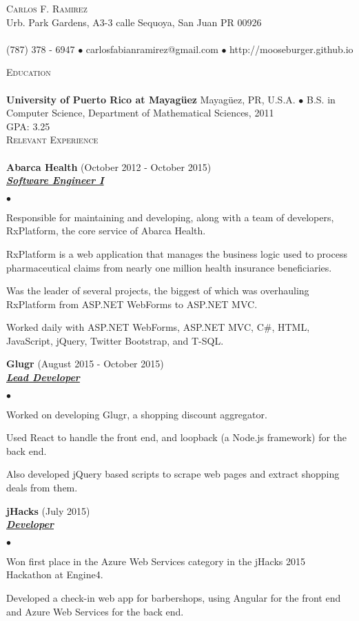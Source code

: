 \documentclass{article}
\newcommand{\lineunder}{\vspace*{-8pt} \\ \hspace*{-18pt} \hrulefill \\}
\newcommand{\header}[1]{{\hspace*{-15pt}\vspace*{6pt} \textsc{#1}} \vspace*{-6pt} \lineunder}
\newcommand{\employer}[3]{{ \textbf{#1} (#2)\\ \underline{\textbf{\emph{#3}}}\\  }}
\newcommand{\contact}[3]{
\vspace*{-8pt}
\begin{center}
{\LARGE \scshape {#1}}\\
#2 \lineunder 
#3
\end{center}
\vspace*{-8pt}
}
\newenvironment{achievements}{\begin{list}{$\bullet$}{\topsep 0pt \itemsep -2pt}}{\vspace*{4pt}\end{list}}
\newcommand{\school}[4]{
 \textbf{#1} #2 $\bullet$ #3\\
 #4 \\
}
\begin{document}
\small
\smallskip
\vspace*{-44pt}

\contact{Carlos F. Ramirez}
{Urb. Park Gardens, A3-3 calle Sequoya, San Juan PR 00926}
{(787) 378 - 6947 $\bullet$ carlosfabianramirez@gmail.com $\bullet$ http://mooseburger.github.io}

\header{Education}

\school{University of Puerto Rico at Mayag\"{u}ez}{Mayag\"{u}ez, PR, U.S.A.}{B.S. in Computer Science, Department of Mathematical Sciences, 2011}
{GPA: 3.25}
\header{Relevant Experience}

\employer{Abarca Health}{October 2012 - October 2015}{Software Engineer I}
	\begin{achievements}
	\item Responsible for maintaining and developing, along with a team of developers, RxPlatform, the core service of Abarca Health.
	\item RxPlatform is a web application that manages the business logic used to process pharmaceutical claims from nearly one million health insurance beneficiaries.
	\item Was the leader of several projects, the biggest of which was overhauling RxPlatform from ASP.NET WebForms to ASP.NET MVC. 	
	\item Worked daily with ASP.NET WebForms, ASP.NET MVC, C\string#, HTML, JavaScript, jQuery, Twitter Bootstrap, and T-SQL. 
	\end{achievements}

\employer{Glugr}{August 2015 - October 2015}{Lead Developer}
	\begin{achievements}
	\item Worked on developing Glugr, a shopping discount aggregator.
	\item Used React to handle the front end, and loopback (a Node.js framework) for the back end.
	\item Also developed jQuery based scripts to scrape web pages and extract shopping deals from them. 
	\end{achievements}

\employer{jHacks}{July 2015}{Developer}
	\begin{achievements}
	\item Won first place in the Azure Web Services category in the jHacks 2015 Hackathon at Engine4.
	\item Developed a check-in web app for barbershops, using Angular for the front end and Azure Web Services for the back end.
	\end{achievements}
\end{document}

